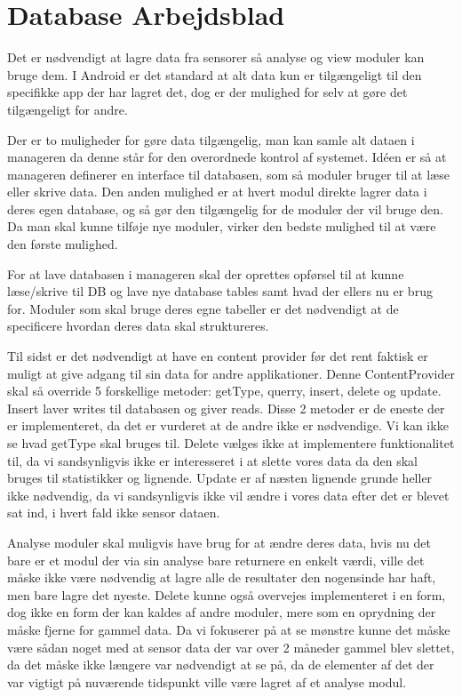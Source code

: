 \chapter{Database Arbejdsblad}
Det er nødvendigt at lagre data fra sensorer så analyse og view moduler kan bruge dem.
I Android er det standard at alt data kun er tilgængeligt til den specifikke app der har lagret det, dog er der mulighed for selv at gøre det tilgængeligt for andre.

Der er to muligheder for gøre data tilgængelig, man kan samle alt dataen i manageren da denne står for den overordnede kontrol af systemet. Idéen er så at manageren definerer en interface til databasen, som så moduler bruger til at læse eller skrive data. 
Den anden mulighed er at hvert modul direkte lagrer data i deres egen database, og så gør den tilgængelig for de moduler der vil bruge den.
Da man skal kunne tilføje nye moduler, virker den bedste mulighed til at være den første mulighed.

For at lave databasen i manageren skal der oprettes opførsel til at kunne læse/skrive til DB og lave nye database tables samt hvad der ellers nu er brug for.
Moduler som skal bruge deres egne tabeller er det nødvendigt at de specificere hvordan deres data skal struktureres.

Til sidst er det nødvendigt at have en content provider før det rent faktisk er muligt at give adgang til sin data for andre applikationer.
Denne ContentProvider skal så override 5 forskellige metoder:  getType, querry, insert, delete og update.
Insert laver writes til databasen og giver reads.
Disse 2 metoder er de eneste der er implementeret, da det er vurderet at de andre ikke er nødvendige.
Vi kan ikke se hvad getType skal bruges til.
Delete vælges ikke at implementere funktionalitet til, da vi sandsynligvis ikke er interesseret i at slette vores data da den skal bruges til statistikker og lignende.
Update er af næsten lignende grunde heller ikke nødvendig, da vi sandsynligvis ikke vil ændre i vores data efter det er blevet sat ind, i hvert fald ikke sensor dataen.

Analyse moduler skal muligvis have brug for at ændre deres data, hvis nu det bare er et modul der via sin analyse bare returnere en enkelt værdi, ville det måske ikke være nødvendig at lagre alle de resultater den nogensinde har haft, men bare lagre det nyeste.
Delete kunne også overvejes implementeret i en form, dog ikke en form der kan kaldes af andre moduler, mere som en oprydning der måske fjerne for gammel data. Da vi fokuserer på at se mønstre kunne det måske være sådan noget med at sensor data der var over 2 måneder gammel blev slettet, da det måske ikke længere var nødvendigt at se på, da de elementer af det der var vigtigt på nuværende tidspunkt ville være lagret af et analyse modul.